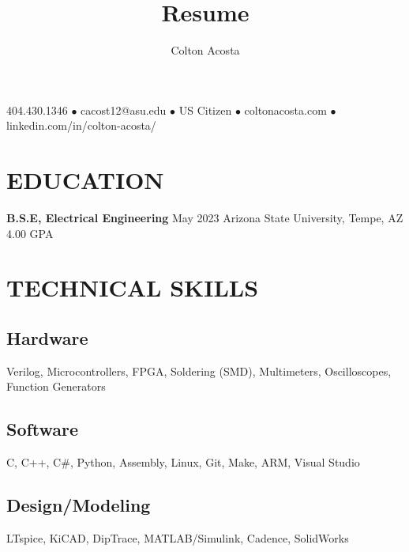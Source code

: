 \documentclass{article}
\makeatletter
\renewcommand{\maketitle}{
	\begin{center}
		{\huge\bfseries
			\theauthor}
			
		404.430.1346 $\bullet$ cacost12@asu.edu $\bullet$ US Citizen $\bullet$ coltonacosta.com $\bullet$ linkedin.com/in/colton-acosta/
	\end{center}
}
\makeatother
\begin{document}
\title{Resume}
\author{Colton Acosta}
\maketitle
\section{EDUCATION}
\textbf{B.S.E, Electrical Engineering}
\hfill 
May 2023
\linebreak
Arizona State University, Tempe, AZ 
\hfill
4.00 GPA

\section{TECHNICAL SKILLS}
\subsection{Hardware}
Verilog, Microcontrollers, FPGA, Soldering (SMD), Multimeters, Oscilloscopes, Function Generators 
\subsection{Software} 
C, C++, C\#, Python, Assembly, Linux, Git, Make, ARM, Visual Studio 
\subsection{Design/Modeling}
LTspice, KiCAD, DipTrace, MATLAB/Simulink, Cadence, SolidWorks
\end{document}
